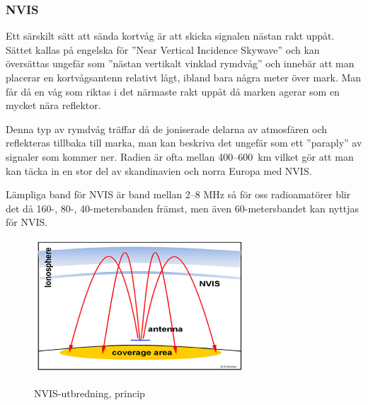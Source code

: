 \subsubsection{NVIS}

Ett särskilt sätt att sända kortvåg är att skicka signalen nästan rakt uppåt. Sättet kallas på engelska för ''Near Vertical Incidence Skywave'' och kan översättas ungefär som ''nästan vertikalt vinklad rymdvåg'' och innebär att man placerar en kortvågsantenn relativt lågt, ibland bara några meter över mark. Man får då en våg som riktas i det närmaste rakt uppåt då marken agerar som en mycket nära reflektor.

Denna typ av rymdvåg träffar då de joniserade delarna av atmosfären och reflekteras tillbaka till marka, man kan beskriva det ungefär som ett ''paraply'' av signaler som kommer ner. Radien är ofta mellan 400--600~km vilket gör att man kan täcka in en stor del av skandinavien och norra Europa med NVIS.

Lämpliga band för NVIS är band mellan 2--8 MHz så för oss radioamatörer blir det då 160-, 80-, 40-metersbanden främst, men även 60-metersbandet kan nyttjas för NVIS.

\begin{figure}[h]
	\centering
	\includegraphics[width=0.7\textwidth]{bilder/NVIS-Propagation}
	\label{fig:nvis-propagation}
	\caption{NVIS-utbredning, princip}
\end{figure}

